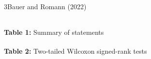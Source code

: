 \documentclass[xcolor=table,9pt,aspectratio=169]{beamer}
\begin{document}
\begin{frame}{\vspace*{10mm}3\hspace*{1em}Bauer and Romann (2022)}
\vspace*{-5mm}
\begin{multicols}{2}
\begin{center}
   \\
   {\footnotesize\textbf{Table 1:} Summary of statements}\\
   \\
   {\footnotesize\textbf{Table 2:} Two-tailed Wilcoxon signed-rank tests}
\end{center}
\end{multicols}
\end{frame}
\end{document}
